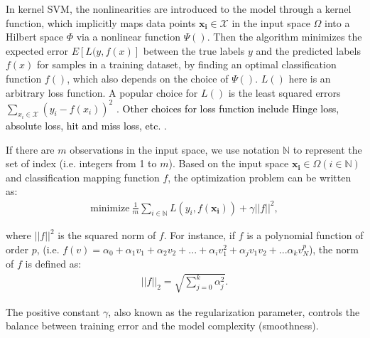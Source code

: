 In kernel SVM, the nonlinearities are introduced to the model through a kernel function, which implicitly maps data points $\mathbf{x_i} \in \mathcal{X}$ in the input space $\Omega$ into a Hilbert space $\Phi$ via a nonlinear function $\Psi()$\cite{aronszajn1950theory}. Then the algorithm minimizes the expected error $E[L(y,f(x)]$ between the true labels $y$ and the predicted labels $f(x)$ for samples in a training dataset, by finding an optimal classification function $f()$, which also depends on the choice of $\Psi()$. $L()$ here is an arbitrary loss function. A popular choice for $L()$ is the least squared errors $\sum\limits_{x_i \in \mathcal{X}} (y_i-f(x_i))^2$ \cite{scholkopf1999advances}. \textcolor{black}{Other choices for loss function include Hinge loss, absolute loss, hit and miss loss, etc. \cite{weston1999support,masnadi2009design}}.

If there are $m$ observations in the input space, we use notation $\mathbb{N}$ to represent the set of index (i.e. integers from 1 to $m$). Based on the input space $\mathbf{x_i}\in \Omega (i\in \mathbb{N})$ and classification mapping function $f$, the optimization problem can be written as:
\begin{align}
    \text{minimize}~\frac{1}{m}\sum_{i\in \mathbb{N}}L(y_i,f(\mathbf{x_i})) + \gamma||f||^2,
    \label{eq:kernel}
\end{align}

where $||f||^2$ is the squared norm of $f$. For instance, if $f$ is a polynomial function of order $p$, (i.e. $f(v)=\alpha_0+\alpha_1 v_1+\alpha_2 v_2+...+ \alpha_i v_1^2 + \alpha_j v_1v_2+... \alpha_k v_N^p$), the norm of $f$ is defined as:  %
\begin{align}
	||f||_2 = \sqrt{\sum_{j=0}^{k} \alpha_j^2}.
\end{align}

The positive constant $\gamma$, also known as the regularization parameter, controls the balance between training error and the model complexity (smoothness).




